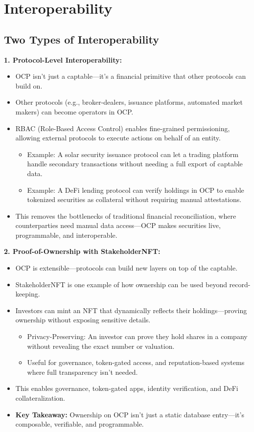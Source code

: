\documentclass[11pt,a4paper]{article}
\begin{document}
\section{Interoperability}

\subsection{Two Types of Interoperability}

\textbf{1. Protocol-Level Interoperability:}
\begin{itemize}
    \item OCP isn't just a captable---it's a financial primitive that other protocols can build on.
    \item Other protocols (e.g., broker-dealers, issuance platforms, automated market makers) can become operators in OCP.
    \item RBAC (Role-Based Access Control) enables fine-grained permissioning, allowing external protocols to execute actions on behalf of an entity.
    \begin{itemize}
        \item Example: A solar security issuance protocol can let a trading platform handle secondary transactions without needing a full export of captable data.
        \item Example: A DeFi lending protocol can verify holdings in OCP to enable tokenized securities as collateral without requiring manual attestations.
    \end{itemize}
    \item This removes the bottlenecks of traditional financial reconciliation, where counterparties need manual data access---OCP makes securities live, programmable, and interoperable.
\end{itemize}

\textbf{2. Proof-of-Ownership with StakeholderNFT:}
\begin{itemize}
    \item OCP is extensible---protocols can build new layers on top of the captable.
    \item StakeholderNFT is one example of how ownership can be used beyond record-keeping.
    \item Investors can mint an NFT that dynamically reflects their holdings---proving ownership without exposing sensitive details.
    \begin{itemize}
        \item Privacy-Preserving: An investor can prove they hold shares in a company without revealing the exact number or valuation.
        \item Useful for governance, token-gated access, and reputation-based systems where full transparency isn't needed.
    \end{itemize}
    \item This enables governance, token-gated apps, identity verification, and DeFi collateralization.
    \item \textbf{Key Takeaway:} Ownership on OCP isn't just a static database entry---it's composable, verifiable, and programmable.
\end{itemize}
\end{document}
